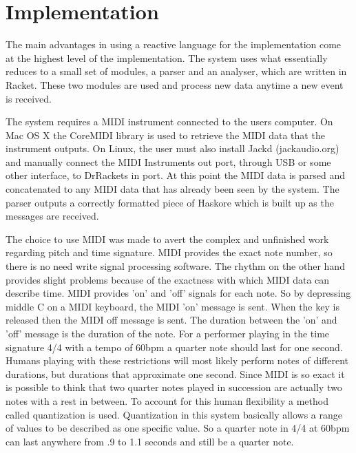 \documentclass[12pt]{ucthesis}
\begin{document}

\chapter{Implementation}
\label{Implementation}
The main advantages in using a reactive language for the implementation come at the highest level of the implementation. The system uses what essentially reduces to a small set of modules, a parser and an analyser, which are written in Racket. These two modules are used and process new data anytime a new event is received. 

The system requires a MIDI instrument connected to the users computer. On Mac OS X the CoreMIDI library is used to retrieve the MIDI data that the instrument outputs. On Linux, the user must also install Jackd (jackaudio.org) and manually connect the MIDI Instruments out port, through USB or some other interface, to DrRackets in port. At this point the MIDI data is parsed and concatenated to any MIDI data that has already been seen by the system. The parser outputs a correctly formatted piece of Haskore which is built up as the messages are received. 

The choice to use MIDI was made to avert the complex and unfinished work regarding pitch and time signature. MIDI provides the exact note number, so there is no need write signal processing software. The rhythm on the other hand provides slight problems because of the exactness with which MIDI data can describe time. MIDI provides 'on' and 'off' signals for each note. So by depressing middle C on a MIDI keyboard, the MIDI 'on' message is sent. When the key is released then the MIDI off message is sent. The duration between the 'on' and 'off' message is the duration of the note. For a performer playing in the time signature 4/4 with a tempo of 60bpm a quarter note should last for one second. Humans playing with these restrictions will most likely perform notes of different durations, but durations that approximate one second. Since MIDI is so exact it is possible to think that two quarter notes played in succession are actually two notes with a rest in between. To account for this human flexibility a method called quantization is used. Quantization in this system basically allows a range of values to be described as one specific value. So a quarter note in 4/4 at 60bpm can last anywhere from .9 to 1.1 seconds and still be a quarter note. 
\end{document}
